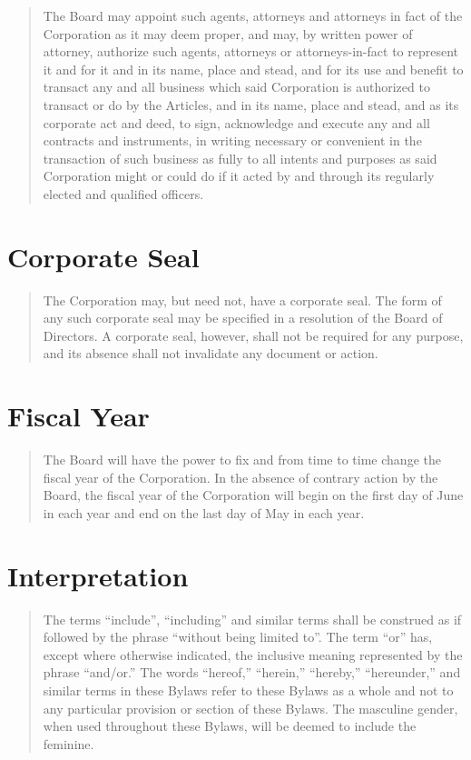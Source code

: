 \documentclass[
]{book}
\begin{document}
\begin{quote}
The Board may appoint such agents, attorneys and attorneys in fact of
the Corporation as it may deem proper, and may, by written power of
attorney, authorize such agents, attorneys or attorneys-in-fact to
represent it and for it and in its name, place and stead, and for its
use and benefit to transact any and all business which said
Corporation is authorized to transact or do by the Articles, and in
its name, place and stead, and as its corporate act and deed, to sign,
acknowledge and execute any and all contracts and instruments, in
writing necessary or convenient in the transaction of such business as
fully to all intents and purposes as said Corporation might or could
do if it acted by and through its regularly elected and qualified
officers.
\end{quote}

\section{Corporate Seal}\label{corporate-seal}

\begin{quote}
The Corporation may, but need not, have a corporate seal. The form of
any such corporate seal may be specified in a resolution of the Board
of Directors. A corporate seal, however, shall not be required for any
purpose, and its absence shall not invalidate any document or action.
\end{quote}

\section{Fiscal Year}\label{fiscal-year}

\begin{quote}
The Board will have the power to fix and from time to time change the
fiscal year of the Corporation. In the absence of contrary action by
the Board, the fiscal year of the Corporation will begin on the first
day of June in each year and end on the last day of May in each year.
\end{quote}

\section{Interpretation}\label{interpretation}

\begin{quote}
The terms ``include'', ``including'' and similar terms shall be construed
as if followed by the phrase ``without being limited to''. The term ``or''
has, except where otherwise indicated, the inclusive meaning
represented by the phrase ``and/or.'' The words ``hereof,'' ``herein,''
``hereby,'' ``hereunder,'' and similar terms in these Bylaws refer to
these Bylaws as a whole and not to any particular provision or section
of these Bylaws. The masculine gender, when used throughout these
Bylaws, will be deemed to include the feminine.
\end{quote}
\end{document}
